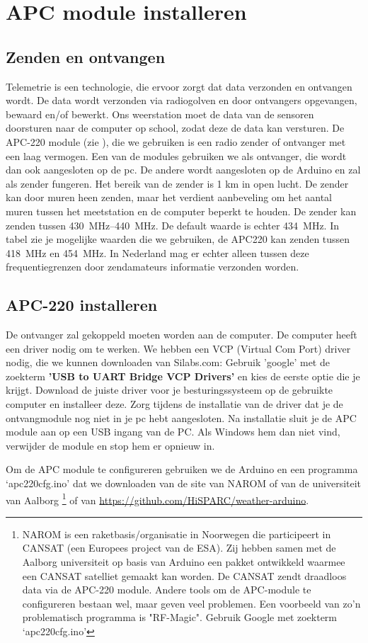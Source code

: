 \section{APC module installeren}

\subsection{Zenden en ontvangen} Telemetrie is een technologie, die
ervoor zorgt dat data verzonden en ontvangen wordt. De data wordt
verzonden via radiogolven en door ontvangers opgevangen, bewaard en/of
bewerkt. Ons weerstation moet de data van de sensoren doorsturen naar de
\hisparc computer op school, zodat deze de data kan versturen. De
APC-220 module (zie ), die we gebruiken is een
radio zender of ontvanger met een laag vermogen. Een van de modules
gebruiken we als ontvanger, die wordt dan ook aangesloten op de pc. De
andere wordt aangesloten op de Arduino en zal als zender fungeren. Het
bereik van de zender is 1 km in open lucht. De zender kan door muren heen
zenden, maar het verdient aanbeveling om het aantal muren tussen het
meetstation en de computer beperkt te houden. De zender kan zenden
tussen \SIrange{430}{440}{\MHz}. De default waarde is echter
\SI{434}{\MHz}. In tabel zie je mogelijke waarden die we gebruiken, de APC220
kan zenden tussen \SI{418}{\MHz} en \SI{454}{\MHz}.
In Nederland mag er echter alleen tussen deze frequentiegrenzen door
zendamateurs informatie verzonden worden.


\subsection{APC-220 installeren}
De ontvanger zal gekoppeld moeten worden aan de computer. De computer heeft
een driver nodig om te werken. We hebben een VCP (Virtual Com Port) driver nodig,
die we kunnen downloaden van Silabs.com:
Gebruik 'google' met de zoekterm \textbf{'USB to UART Bridge VCP Drivers'} en kies de eerste
optie die je krijgt.
Download de juiste driver voor je besturingssysteem op de gebruikte computer
en installeer deze. Zorg tijdens de installatie van de driver dat je de
ontvangmodule nog niet in je pc hebt aangesloten.
Na installatie sluit je de APC module  aan op een
USB ingang van de PC. Als Windows hem dan niet vind, verwijder de module en
stop hem er opnieuw in.

Om de APC module te configureren gebruiken we de Arduino en een
programma `apc220cfg.ino' dat we downloaden van de site van NAROM of van
de universiteit van Aalborg \footnote{NAROM is een
raketbasis/organisatie in Noorwegen die participeert in CANSAT (een
Europees project van de ESA). Zij hebben samen met de Aalborg
universiteit op basis van Arduino een pakket ontwikkeld waarmee een
CANSAT satelliet gemaakt kan worden. De CANSAT zendt draadloos data via
de APC-220 module. Andere tools om de APC-module te configureren bestaan
wel, maar geven veel problemen. Een voorbeeld van zo'n problematisch
programma is "RF-Magic". Gebruik Google met zoekterm `apc220cfg.ino'} of
van \url{https://github.com/HiSPARC/weather-arduino}.


